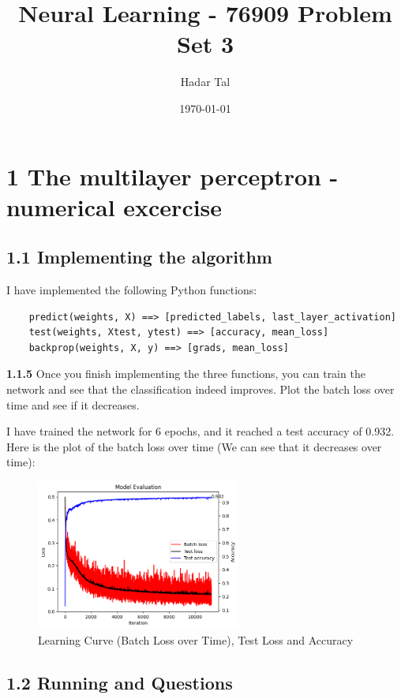 \documentclass[a4paper, 12pt]{article}
\title{Neural Learning - 76909 Problem Set 3}
\author{Hadar Tal}
\date{\today}
\begin{document}
\maketitle

\section*{1 The multilayer perceptron - numerical excercise}

\subsection*{1.1 Implementing the algorithm}

I have implemented the following Python functions:
\begin{lstlisting}
    predict(weights, X) ==> [predicted_labels, last_layer_activation]
    test(weights, Xtest, ytest) ==> [accuracy, mean_loss]
    backprop(weights, X, y) ==> [grads, mean_loss]
\end{lstlisting}
\bigskip
 \textcolor{myblue}{ \textbf{1.1.5} Once you finish implementing the three functions, you can train the network and see that the
classification indeed improves. Plot the batch loss over time and see if it decreases. }

I have trained the network for 6 epochs, and it reached a test accuracy of 0.932.
Here is the plot of the batch loss over time (We can see that it decreases over time): 

\begin{figure}[H]
    \centering
    \includegraphics[width=0.6\textwidth]{../figs/1-1-5.png}   
    \caption{Learning Curve (Batch Loss over Time), Test Loss and Accuracy} 
    \label{fig:scenario1}
\end{figure}


\subsection*{1.2 Running and Questions}
\end{document}
